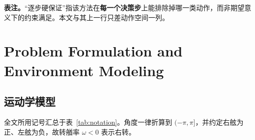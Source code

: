 \documentclass[12pt,letterpaper]{article}
\begin{document}
\begin{table}[htbp]
 \vspace{4pt}\footnotesize
 \textbf{表注。}“逐步硬保证”指该方法在\textbf{每一个决策步}上能排除掉哪一类动作，而非期望意义下的约束满足。本文与其上一行只差动作空间一列。
\end{table}

\section{Problem Formulation and Environment Modeling}
\label{sec:problem-setup}

\subsection{运动学模型}
\label{sec:model}

全文所用记号汇总于表~\ref{tab:notation}。角度一律折算到 $(-\pi,\pi]$，并约定右舷为正、左舷为负，故转艏率 $\omega<0$ 表示右转。
\end{document}
